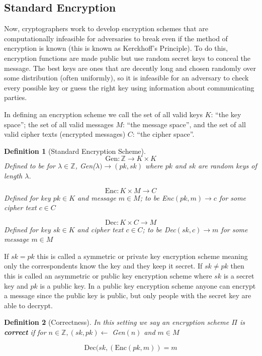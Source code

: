 \documentclass[12pt,twoside]{reedthesis}
\newtheorem{definition}{Definition}
\begin{document}
    \subsection{Standard Encryption}
    Now, cryptographers work to develop encryption schemes that are computationally infeasible for adversaries to break even if the method of encryption is known (this is known as Kerckhoff's Principle). To do this, encryption functions are made public but use random secret keys to conceal the message. The best keys are ones that are decently long and chosen randomly over some distribution (often uniformly), so it is infeasible for an adversary to check every possible key or guess the right key using information about communicating parties.
       \par In defining an encryption scheme we call the set of all valid keys $K$: ``the key space''; the set of all valid messages $M$: ``the message space'', and the set of all valid cipher texts (encrypted messages) $C$: ``the cipher space''.

\begin{definition}[Standard Encryption Scheme]
     
 
 $$\text{Gen}:\mathbb{Z} \rightarrow K \times K$$
 Defined to be for $\lambda \in \mathbb{Z}$, Gen($\lambda ) \rightarrow (pk,sk)$ where $pk$ and $sk$ are random keys of length $\lambda$.
 
  $$\text{Enc}:K \times M \rightarrow C$$
Defined for key $pk\in K$ and message $m\in M$; to be Enc$(pk,m) \rightarrow c$ for some cipher text $c\in C$
 
 $$\text{Dec}:K \times C \rightarrow M$$
 Defined for key $sk \in K$ and cipher text $c\in C$; to be Dec$(sk,c) \rightarrow m$ for some message $m\in M$
 
 \end{definition}
 
 
\par If $sk = pk$ this is called a symmetric or private key encryption scheme meaning only the correspondents know the key and they keep it secret. If $sk \not= pk$ then this is called an asymmetric or public key encryption scheme where $sk$ is a secret key and $pk$ is a public key. In a public key encryption scheme anyone can encrypt a message since the public key is public, but only people with the secret key are able to decrypt.


\begin{definition}[Correctness]
In this setting we say an encryption scheme $\Pi$ is \textbf{correct} if for $n\in \mathbb{Z} , (sk,pk) \leftarrow$ Gen$(n)$ and $m\in M$ 

$$\text{Dec}(sk, (\text{Enc}(pk,m)) = m$$
\end{definition}
\end{document}

